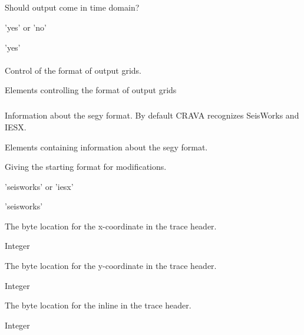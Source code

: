 \subparagraph{}
 \slist
   \item \Description Should output come in time domain?
   \item \Argument 'yes' or 'no'
   \item \Default 'yes'
 \elist

\paragraph{}
 \slist
   \item \Description Control of the format of output grids.
   \item \Argument Elements controlling the format of output grids
   \item \Default
 \elist

\subparagraph{}
 \slist
   \item \Description Information about the segy format. By default CRAVA recognizes SeisWorks and IESX.
   \item \Argument Elements containing information about the segy format.
   \item \Default
 \elist
{}
 \slist
   \item \Description Giving the starting format for modifications.
   \item \Argument 'seisworks' or 'iesx'
   \item \Default 'seisworks'
 \elist

 \slist
   \item \Description The byte location for the x-coordinate in the trace header.
   \item \Argument Integer
   \item \Default
 \elist

 \slist
   \item \Description The byte location for the y-coordinate in the trace header.
   \item \Argument Integer
   \item \Default
 \elist

 \slist
   \item \Description The byte location for the inline in the trace header.
   \item \Argument Integer
   \item \Default
 \elist

